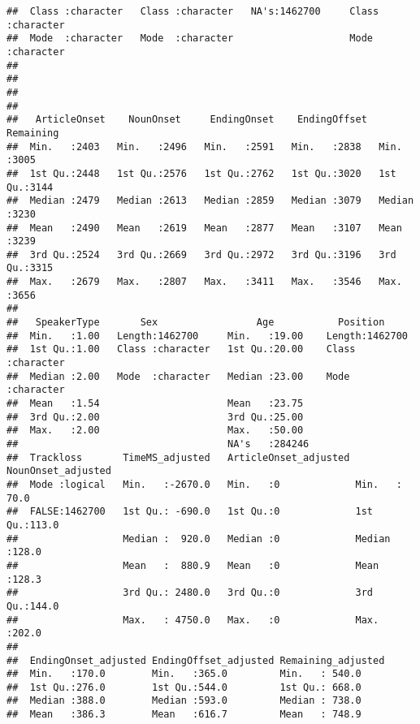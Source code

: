 \documentclass[
]{article}
\begin{document}
\begin{verbatim}
##  Class :character   Class :character   NA's:1462700     Class :character  
##  Mode  :character   Mode  :character                    Mode  :character  
##                                                                           
##                                                                           
##                                                                           
##                                                                           
##   ArticleOnset    NounOnset     EndingOnset    EndingOffset    Remaining   
##  Min.   :2403   Min.   :2496   Min.   :2591   Min.   :2838   Min.   :3005  
##  1st Qu.:2448   1st Qu.:2576   1st Qu.:2762   1st Qu.:3020   1st Qu.:3144  
##  Median :2479   Median :2613   Median :2859   Median :3079   Median :3230  
##  Mean   :2490   Mean   :2619   Mean   :2877   Mean   :3107   Mean   :3239  
##  3rd Qu.:2524   3rd Qu.:2669   3rd Qu.:2972   3rd Qu.:3196   3rd Qu.:3315  
##  Max.   :2679   Max.   :2807   Max.   :3411   Max.   :3546   Max.   :3656  
##                                                                            
##   SpeakerType       Sex                 Age           Position        
##  Min.   :1.00   Length:1462700     Min.   :19.00    Length:1462700    
##  1st Qu.:1.00   Class :character   1st Qu.:20.00    Class :character  
##  Median :2.00   Mode  :character   Median :23.00    Mode  :character  
##  Mean   :1.54                      Mean   :23.75                      
##  3rd Qu.:2.00                      3rd Qu.:25.00                      
##  Max.   :2.00                      Max.   :50.00                      
##                                    NA's   :284246                     
##  Trackloss       TimeMS_adjusted   ArticleOnset_adjusted NounOnset_adjusted
##  Mode :logical   Min.   :-2670.0   Min.   :0             Min.   : 70.0     
##  FALSE:1462700   1st Qu.: -690.0   1st Qu.:0             1st Qu.:113.0     
##                  Median :  920.0   Median :0             Median :128.0     
##                  Mean   :  880.9   Mean   :0             Mean   :128.3     
##                  3rd Qu.: 2480.0   3rd Qu.:0             3rd Qu.:144.0     
##                  Max.   : 4750.0   Max.   :0             Max.   :202.0     
##                                                                            
##  EndingOnset_adjusted EndingOffset_adjusted Remaining_adjusted
##  Min.   :170.0        Min.   :365.0         Min.   : 540.0    
##  1st Qu.:276.0        1st Qu.:544.0         1st Qu.: 668.0    
##  Median :388.0        Median :593.0         Median : 738.0    
##  Mean   :386.3        Mean   :616.7         Mean   : 748.9    

\end{verbatim}
\end{document}
